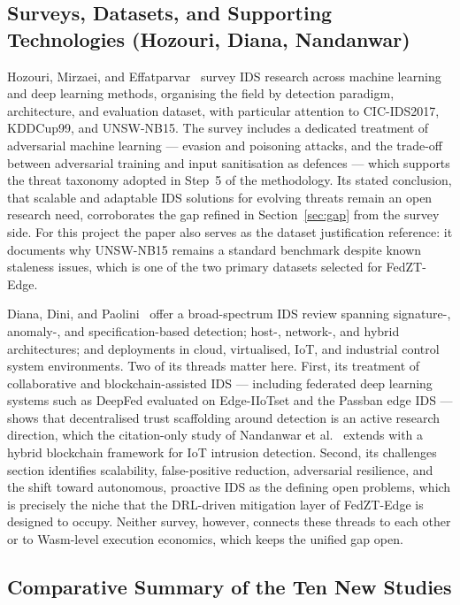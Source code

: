 \documentclass[11pt,a4paper]{article}
\begin{document}
\subsection{Surveys, Datasets, and Supporting Technologies (Hozouri,
Diana, Nandanwar)}\label{sec:surveys}

Hozouri, Mirzaei, and Effatparvar~\cite{hozouri2025} survey IDS research
across machine learning and deep learning methods, organising the field by
detection paradigm, architecture, and evaluation dataset, with particular
attention to CIC-IDS2017, KDDCup99, and UNSW-NB15. The survey includes a
dedicated treatment of adversarial machine learning --- evasion and
poisoning attacks, and the trade-off between adversarial training and
input sanitisation as defences --- which supports the threat taxonomy
adopted in Step~5 of the methodology. Its stated conclusion, that scalable
and adaptable IDS solutions for evolving threats remain an open research
need, corroborates the gap refined in Section~\ref{sec:gap} from the
survey side. For this project the paper also serves as the dataset
justification reference: it documents why UNSW-NB15 remains a standard
benchmark despite known staleness issues, which is one of the two primary
datasets selected for FedZT-Edge.

Diana, Dini, and Paolini~\cite{diana2025} offer a broad-spectrum IDS
review spanning signature-, anomaly-, and specification-based detection;
host-, network-, and hybrid architectures; and deployments in cloud,
virtualised, IoT, and industrial control system environments. Two of its
threads matter here. First, its treatment of collaborative and
blockchain-assisted IDS --- including federated deep learning systems such
as DeepFed evaluated on Edge-IIoTset and the Passban edge IDS --- shows
that decentralised trust scaffolding around detection is an active
research direction, which the citation-only study of Nandanwar et
al.~\cite{nandanwar2025} extends with a hybrid blockchain framework for
IoT intrusion detection. Second, its challenges section identifies
scalability, false-positive reduction, adversarial resilience, and the
shift toward autonomous, proactive IDS as the defining open problems,
which is precisely the niche that the DRL-driven mitigation layer of
FedZT-Edge is designed to occupy. Neither survey, however, connects these
threads to each other or to Wasm-level execution economics, which keeps
the unified gap open.

\subsection{Comparative Summary of the Ten New Studies}\label{sec:comptable}
\end{document}
